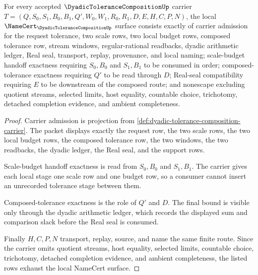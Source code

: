 \begin{theorem}
\label{thm:dyadic-tolerance-composition-namecert-obligations}
For every accepted $\DyadicToleranceCompositionUp$ carrier $T=(Q,S_0,S_1,B_0,B_1,Q',W_0,W_1,R_0,R_1,D,E,H,C,P,N)$, the local $\NameCert_{\DyadicToleranceCompositionUp}$ surface consists exactly of carrier admission for the request tolerance, two scale rows, two local budget rows, composed tolerance row, stream windows, regular-rational readbacks, dyadic arithmetic ledger, Real seal, transport, replay, provenance, and local naming; scale-budget handoff exactness requiring $S_0,B_0$ and $S_1,B_1$ to be consumed in order; composed-tolerance exactness requiring $Q'$ to be read through $D$; Real-seal compatibility requiring $E$ to be downstream of the composed route; and nonescape excluding quotient streams, selected limits, host equality, countable choice, trichotomy, detached completion evidence, and ambient completeness.
\end{theorem}
\begin{proof}
Carrier admission is projection from \autoref{def:dyadic-tolerance-composition-carrier}. The packet displays exactly the request row, the two scale rows, the two local budget rows, the composed tolerance row, the two windows, the two readbacks, the dyadic ledger, the Real seal, and the support rows.

Scale-budget handoff exactness is read from $S_0,B_0$ and $S_1,B_1$. The carrier gives each local stage one scale row and one budget row, so a consumer cannot insert an unrecorded tolerance stage between them.

Composed-tolerance exactness is the role of $Q'$ and $D$. The final bound is visible only through the dyadic arithmetic ledger, which records the displayed sum and comparison slack before the Real seal is consumed.

Finally $H,C,P,N$ transport, replay, source, and name the same finite route. Since the carrier omits quotient streams, host equality, selected limits, countable choice, trichotomy, detached completion evidence, and ambient completeness, the listed rows exhaust the local NameCert surface.
\end{proof}

